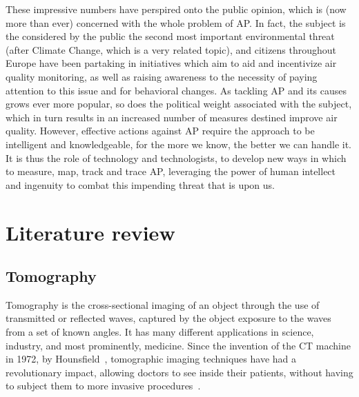 These impressive numbers have perspired onto the public opinion, which
is (now more than ever) concerned with the whole problem of \gls{AP}. In
fact, the subject is the considered by the public the second most
important environmental threat (after Climate Change, which is a very
related topic), and citizens throughout Europe have been partaking in
initiatives which aim to aid and incentivize air quality monitoring, as
well as raising awareness to the necessity of paying attention to this
issue and for behavioral changes. As tackling \acrlong{AP} and its
causes grows ever more popular, so does the political weight associated
with the subject, which in turn results in an increased number of
measures destined improve air quality. However, effective actions
against \gls{AP} require the approach to be intelligent and
knowledgeable, for the more we know, the better we can handle it. It is
thus the role of technology and technologists, to develop new ways in
which to measure, map, track and trace \gls{AP}, leveraging the power of
human intellect and ingenuity to combat this impending threat that is
upon us.

\section{Literature review}%
\label{sec:literature_review}



\subsection{Tomography}%
\label{sub:tomography}

Tomography is the cross-sectional imaging of an object through the use
of transmitted or reflected waves, captured by the object exposure to
the waves from a set of known angles. It has many different applications
in science, industry, and most prominently, medicine. Since the invention
of the \gls{CT} machine in 1972, by Hounsfield~\cite{Gunderman2006},
tomographic imaging techniques have had a revolutionary impact, allowing
doctors to see inside their patients, without having to subject them to
more invasive procedures~\cite{Kak2001}.

